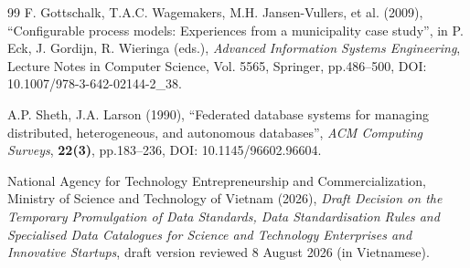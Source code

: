 \begin{thebibliography}{99}
F. Gottschalk, T.A.C. Wagemakers, M.H. Jansen-Vullers, et al. (2009), ``Configurable process models: Experiences from a municipality case study'', in P. Eck, J. Gordijn, R. Wieringa (eds.), \textit{Advanced Information Systems Engineering}, Lecture Notes in Computer Science, Vol. 5565, Springer, pp.486--500, DOI: 10.1007/978-3-642-02144-2\_38.

A.P. Sheth, J.A. Larson (1990), ``Federated database systems for managing distributed, heterogeneous, and autonomous databases'',
\textit{ACM Computing Surveys}, \textbf{22(3)}, pp.183--236, DOI: 10.1145/96602.96604.

National Agency for Technology Entrepreneurship and Commercialization, Ministry of Science and Technology of Vietnam (2026), \textit{Draft Decision on the Temporary Promulgation of Data Standards, Data Standardisation Rules and Specialised Data Catalogues for Science and Technology Enterprises and Innovative Startups}, draft version reviewed 8 August 2026 (in Vietnamese).

\end{thebibliography}
